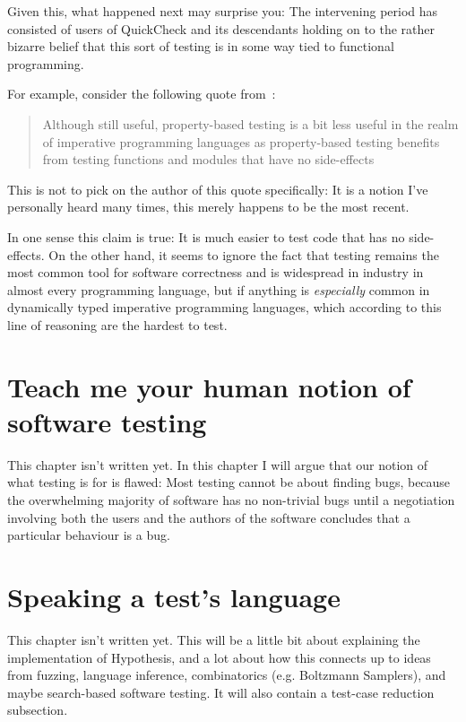 Given this,
what happened next may surprise you:
The intervening period has consisted of users of QuickCheck and its descendants holding on to the rather bizarre belief that this sort of testing is in some way tied to functional programming.

For example,
consider the following quote from~\cite{matela2017tools}:

\begin{quote}
Although still useful,
property-based testing is a bit less useful in the realm of imperative programming languages as property-based testing
benefits from testing functions and modules that have no side-effects
\end{quote}

This is not to pick on the author of this quote specifically:
It is a notion I've personally heard many times,
this merely happens to be the most recent.

In one sense this claim is true:
It is much easier to test code that has no side-effects.
On the other hand,
it seems to ignore the fact that testing remains the most common tool for software correctness and is widespread in industry in almost every programming language,
but if anything is \emph{especially} common in dynamically typed imperative programming languages,
which according to this line of reasoning are the hardest to test.

\chapter{Teach me your human notion of software testing}\label{chap:purposesoftesting}

This chapter isn't written yet.
In this chapter I will argue that our notion of what testing is for is flawed:
Most testing cannot be about finding bugs,
because the overwhelming majority of software has no non-trivial bugs until a negotiation involving both the users and the authors of the software concludes that a particular behaviour is a bug.

\chapter{Speaking a test's language}\label{chap:testinglanguage}

This chapter isn't written yet.
This will be a little bit about explaining the implementation of Hypothesis,
and a lot about how this connects up to ideas from fuzzing, language inference, combinatorics (e.g. Boltzmann Samplers), and maybe search-based software testing.
It will also contain a test-case reduction subsection.

